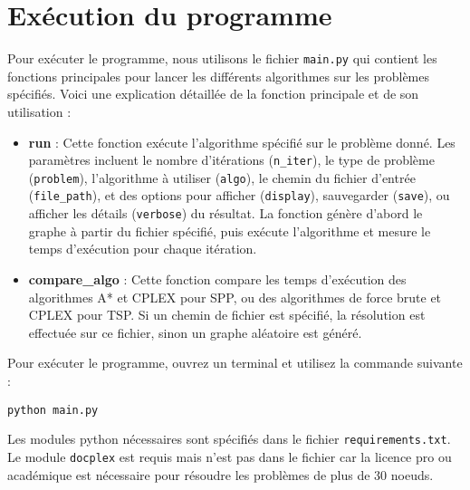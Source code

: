 \section{Exécution du programme}
Pour exécuter le programme, nous utilisons le fichier \texttt{main.py} qui contient les fonctions principales pour lancer les différents algorithmes sur les problèmes spécifiés. Voici une explication détaillée de la fonction principale et de son utilisation :

\begin{itemize}
    \item \textbf{run} : Cette fonction exécute l'algorithme spécifié sur le problème donné. Les paramètres incluent le nombre d'itérations (\texttt{n\_iter}), le type de problème (\texttt{problem}), l'algorithme à utiliser (\texttt{algo}), le chemin du fichier d'entrée (\texttt{file\_path}), et des options pour afficher (\texttt{display}), sauvegarder (\texttt{save}), ou afficher les détails (\texttt{verbose}) du résultat. La fonction génère d'abord le graphe à partir du fichier spécifié, puis exécute l'algorithme et mesure le temps d'exécution pour chaque itération.
    \item \textbf{compare\_algo} : Cette fonction compare les temps d'exécution des algorithmes A* et CPLEX pour \ac{SPP}, ou des algorithmes de force brute et CPLEX pour \ac{TSP}. Si un chemin de fichier est spécifié, la résolution est effectuée sur ce fichier, sinon un graphe aléatoire est généré.
\end{itemize}

Pour exécuter le programme, ouvrez un terminal et utilisez la commande suivante :

\begin{verbatim}
python main.py
\end{verbatim}

Les modules python nécessaires sont spécifiés dans le fichier \texttt{requirements.txt}. Le module \texttt{docplex} est requis mais n'est pas dans le fichier car la licence pro ou académique est nécessaire pour résoudre les problèmes de plus de 30 noeuds.